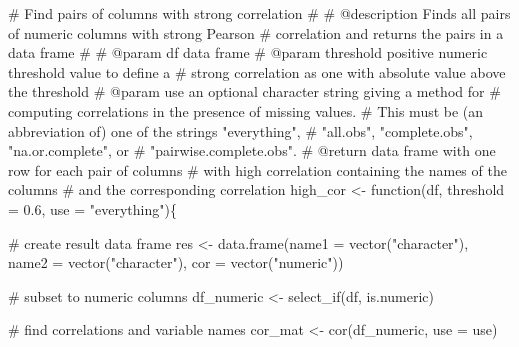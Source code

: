 \documentclass[
  letterpaper,
]{latex/krantz}
\makeatletter
\newenvironment{Shaded}{\begin{snugshade}}{\end{snugshade}}
\newcommand{\AttributeTok}[1]{\textcolor[rgb]{0.40,0.45,0.13}{#1}}
\newcommand{\CommentTok}[1]{\textcolor[rgb]{0.37,0.37,0.37}{#1}}
\newcommand{\ControlFlowTok}[1]{\textcolor[rgb]{0.00,0.23,0.31}{#1}}
\newcommand{\FloatTok}[1]{\textcolor[rgb]{0.68,0.00,0.00}{#1}}
\newcommand{\FunctionTok}[1]{\textcolor[rgb]{0.28,0.35,0.67}{#1}}
\newcommand{\NormalTok}[1]{\textcolor[rgb]{0.00,0.23,0.31}{#1}}
\newcommand{\OtherTok}[1]{\textcolor[rgb]{0.00,0.23,0.31}{#1}}
\newcommand{\StringTok}[1]{\textcolor[rgb]{0.13,0.47,0.30}{#1}}
\newenvironment{kframe}{%
\medskip{}
\setlength{\fboxsep}{.8em}
 \def\at@end@of@kframe{}%
 \ifinner\ifhmode%
  \def\at@end@of@kframe{\end{minipage}}%
  \begin{minipage}{\columnwidth}%
 \fi\fi%
 \def\FrameCommand##1{\hskip\@totalleftmargin \hskip-\fboxsep
 \colorbox{shadecolor}{##1}\hskip-\fboxsep
     \hskip-\linewidth \hskip-\@totalleftmargin \hskip\columnwidth}%
 \MakeFramed {\advance\hsize-\width
   \@totalleftmargin\z@ \linewidth\hsize
   \@setminipage}}%
 {\par\unskip\endMakeFramed%
 \at@end@of@kframe}
\renewenvironment{Shaded}{\begin{kframe}}{\end{kframe}}
\makeatother
\begin{document}
\begin{Shaded}
\begin{Highlighting}[]
\CommentTok{\#\textquotesingle{} Find pairs of columns with strong correlation}
\CommentTok{\#\textquotesingle{} }
\CommentTok{\#\textquotesingle{} @description Finds all pairs of numeric columns with strong Pearson }
\CommentTok{\#\textquotesingle{} correlation and returns the pairs in a data frame}
\CommentTok{\#\textquotesingle{} }
\CommentTok{\#\textquotesingle{} @param df data frame}
\CommentTok{\#\textquotesingle{} @param threshold positive numeric threshold value to define a }
\CommentTok{\#\textquotesingle{} strong correlation as one with absolute value above the threshold}
\CommentTok{\#\textquotesingle{} @param use an optional character string giving a method for }
\CommentTok{\#\textquotesingle{} computing correlations in the presence of missing values. }
\CommentTok{\#\textquotesingle{} This must be (an abbreviation of) one of the strings "everything", }
\CommentTok{\#\textquotesingle{} "all.obs", "complete.obs", "na.or.complete", or }
\CommentTok{\#\textquotesingle{} "pairwise.complete.obs".}
\CommentTok{\#\textquotesingle{} @return data frame with one row for each pair of columns}
\CommentTok{\#\textquotesingle{} with high correlation containing the names of the columns }
\CommentTok{\#\textquotesingle{} and the corresponding correlation}
\NormalTok{high\_cor }\OtherTok{\textless{}{-}} \ControlFlowTok{function}\NormalTok{(df, }\AttributeTok{threshold =} \FloatTok{0.6}\NormalTok{, }\AttributeTok{use =} \StringTok{"everything"}\NormalTok{)\{}
  
  \CommentTok{\# create result data frame}
\NormalTok{  res }\OtherTok{\textless{}{-}} \FunctionTok{data.frame}\NormalTok{(}\AttributeTok{name1 =} \FunctionTok{vector}\NormalTok{(}\StringTok{"character"}\NormalTok{),}
                    \AttributeTok{name2 =} \FunctionTok{vector}\NormalTok{(}\StringTok{"character"}\NormalTok{),}
                    \AttributeTok{cor =} \FunctionTok{vector}\NormalTok{(}\StringTok{"numeric"}\NormalTok{))}
  
  \CommentTok{\# subset to numeric columns}
\NormalTok{  df\_numeric }\OtherTok{\textless{}{-}} \FunctionTok{select\_if}\NormalTok{(df, is.numeric)}
  
  \CommentTok{\# find correlations and variable names}
\NormalTok{  cor\_mat }\OtherTok{\textless{}{-}} \FunctionTok{cor}\NormalTok{(df\_numeric, }\AttributeTok{use =}\NormalTok{ use)}


\end{Highlighting}
\end{Shaded}
\end{document}
